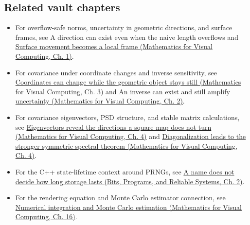 \subsection{Related vault chapters}\label{02-foundations-ii-ch039-related-vault-chapters}

\begin{itemize}
\tightlist
\item
  For overflow-safe norms, uncertainty in geometric directions, and surface frames, see {A direction can exist even when the naive length overflows} and \href{../02-Mathematics-for-Visual-Computing/main.pdf\#nameddest=01-foundations-i-ch017-surface-movement-becomes-a-local-frame}{Surface movement becomes a local frame (Mathematics for Visual Computing, Ch. 1)}.
\item
  For covariance under coordinate changes and inverse sensitivity, see \href{../02-Mathematics-for-Visual-Computing/main.pdf\#nameddest=01-foundations-i-ch019-coordinates-can-change-while-the-geometric-object-stays-still}{Coordinates can change while the geometric object stays still (Mathematics for Visual Computing, Ch. 3)} and \href{../02-Mathematics-for-Visual-Computing/main.pdf\#nameddest=01-foundations-i-ch018-an-inverse-can-exist-and-still-amplify-uncertainty}{An inverse can exist and still amplify uncertainty (Mathematics for Visual Computing, Ch. 2)}.
\item
  For covariance eigenvectors, PSD structure, and stable matrix calculations, see \href{../02-Mathematics-for-Visual-Computing/main.pdf\#nameddest=01-foundations-i-ch020-eigenvectors-reveal-the-directions-a-square-map-does-not-turn}{Eigenvectors reveal the directions a square map does not turn (Mathematics for Visual Computing, Ch. 4)} and \href{../02-Mathematics-for-Visual-Computing/main.pdf\#nameddest=01-foundations-i-ch020-diagonalization-leads-to-the-stronger-symmetric-spectral-theorem}{Diagonalization leads to the stronger symmetric spectral theorem (Mathematics for Visual Computing, Ch. 4)}.
\item
  For the C++ state-lifetime context around PRNGs, see \href{../01-Bits-Programs-and-Reliable-Systems/main.pdf\#nameddest=01-foundations-i-ch002-a-name-does-not-decide-how-long-storage-lasts}{A name does not decide how long storage lasts (Bits, Programs, and Reliable Systems, Ch. 2)}.
\item
  For the rendering equation and Monte Carlo estimator connection, see \href{../02-Mathematics-for-Visual-Computing/main.pdf\#nameddest=03-visual-computing-i-ch012-numerical-integration-and-monte-carlo-estimation}{Numerical integration and Monte Carlo estimation (Mathematics for Visual Computing, Ch. 16)}.
\end{itemize}

